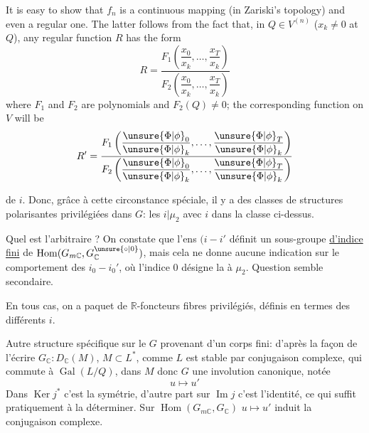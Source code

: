 It is easy to show that $f_n$ is a continuous mapping (in Zariski's topology) and even a regular one. The latter follows from the fact that, in $Q\in V^{(n)}$ ($x_k\ne0$ at $Q$), any regular function $R$ has the form
\[
R=\frac{F_1\left(\dfrac{x_0}{x_k},\ldots,\dfrac{x_T}{x_k}\right)}{F_2\left(\dfrac{x_0}{x_k},\ldots,\dfrac{x_T}{x_k}\right)}
\]
where $F_1$ and $F_2$ are polynomials and $F_2(Q)\ne0$; the corresponding function on $V$ will be
\[
R'=\frac{F_1\left(\dfrac{\unsure{\Phi|\phi}_0}{\unsure{\Phi|\phi}_k},\ldots,\dfrac{\unsure{\Phi|\phi}_T}{\unsure{\Phi|\phi}_k}\right)}{F_2\left(\dfrac{\unsure{\Phi|\phi}_0}{\unsure{\Phi|\phi}_k},\ldots,\dfrac{\unsure{\Phi|\phi}_T}{\unsure{\Phi|\phi}_k}\right)}
\]

de $i$. 
Donc, grâce à cette circonstance spéciale, il y a des classes de  structures polarisantes privilégiées dans $G$: les $i|\mu_2$ avec $i$ dans la classe ci-dessus.

Quel est l'arbitraire ? On constate que l'ens  $(i-i'$  définit un sous-groupe \uline{d'indice fini} de $\operatorname{Hom}(G_{m\mathbb C},G^{\unsure{\circ|0}}_{\mathbb C})$, mais cela ne donne aucune indication sur le comportement des $i_0-i_0'$, où l'indice $0$ désigne la  à $\mu_2$. Question semble secondaire.

En tous cas, on a   paquet de $\mathbb R$-foncteurs fibres privilégiés, définis en termes des différents $i$.


Autre structure spécifique sur le $G$ provenant d'un corps fini: d'après la façon de l'écrire $G_{\mathbb C}:D_{\mathbb C}(M)$, $M\subset L^*$, comme $L$ est stable par conjugaison complexe, qui commute à $\operatorname{Gal}(L/Q)$,  dans $M$ donc $G$ une involution canonique, notée
\[
u\longmapsto u'
\]
Dans $\operatorname{Ker}j^*$ c'est la symétrie, d'autre part sur $\operatorname{Im}j$ c'est l'identité, ce qui suffit pratiquement à la déterminer. Sur $\operatorname{Hom}(G_{m\mathbb C},G_{\mathbb C})$ $u\mapsto u'$ induit la conjugaison complexe.

